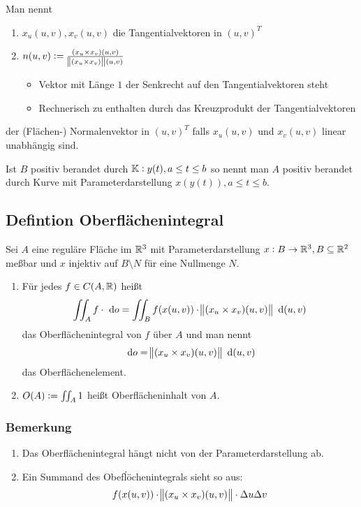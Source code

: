 Man nennt
\begin{enumerate}[label = (\roman*)]
    \item $x_u(u,v), x_v(u,v)$ die Tangentialvektoren in ${(u,v)}^T$
    \item $n(u,v) := \frac{(x_u \times x_v)(u,v)}{\norm{(x_u \times x_v)}(u,v)}$
        \begin{itemize}
            \item Vektor mit Länge $1$ der Senkrecht auf den Tangentialvektoren
                steht
            \item Rechnerisch zu enthalten durch das Kreuzprodukt der
                Tangentialvektoren
        \end{itemize}
\end{enumerate}
der (Flächen-) Normalenvektor in ${(u,v)}^T$ falls $x_u(u,v)$ und $x_v(u,v)$
linear unabhängig sind.

Ist $B$ positiv berandet durch $\mathbb{K}: y(t), a \leq t \leq b$ so nennt man $A$ positiv
berandet durch Kurve mit Parameterdarstellung $x(y(t)), a \leq t \leq b$.

\subsection{Defintion Oberflächenintegral}
Sei $A$ eine reguläre Fläche im $\mathbb{R}^3$ mit Parameterdarstellung $x: B \to \mathbb{R}^3,
B \subseteq \mathbb{R}^2$ meßbar und $x$ injektiv auf $B \setminus N$ für eine Nullmenge
$N$.
\begin{enumerate}[label = (\alph*)]
    \item Für jedes $f \in C(A, \mathbb{R})$ heißt
        \begin{equation*}
            \iint_A f \cdot \text{ d}o= \iint_B f(x(u,v)) \cdot \norm{(x_u \times x_v)
            (u,v)} \text{ d}(u,v)
        \end{equation*}
        das Oberflächenintegral von $f$ über $A$ und man nennt
        \begin{equation*}
            \text{ d}o= \norm{(x_u \times x_v)
            (u,v)} \text{ d}(u,v)
        \end{equation*}
        das Oberflächenelement.
    \item $O(A) := \iint_A 1 \do$ heißt Oberflächeninhalt von $A$.
\end{enumerate}

\subsubsection{Bemerkung}
\begin{enumerate}
    \item Das Oberflächenintegral hängt nicht von der Parameterdarstellung ab.
    \item Ein Summand des Obefĺöchenintegrals sieht so aus:
        \begin{equation*}
            f(x(u,v)) \cdot \norm{(x_u \times x_v)(u,v)} \cdot \Delta u \Delta v
        \end{equation*}
\end{enumerate}

